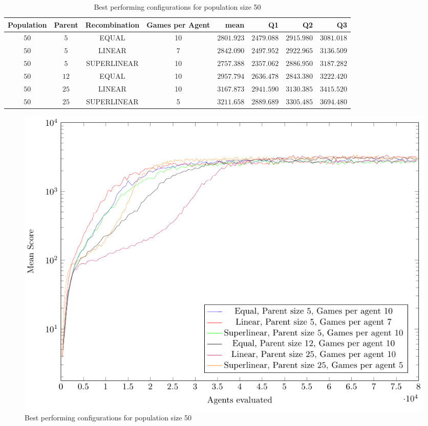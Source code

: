 \begin{table}[H]
\centering
\small
\begin{tabular}{c c c c r r r r}
Population & Parent & Recombination & Games per Agent & mean & Q1 & Q2 & Q3\\
\hline
$50$ & $5$ & EQUAL & 10 & $2801.923$ & $2479.088$ & $2915.980$ & $3081.018$\\
$50$ & $5$ & LINEAR & 7 & $2842.090$ & $2497.952$ & $2922.965$ & $3136.509$\\
$50$ & $5$ & SUPERLINEAR & 10 & $2757.388$ & $2357.062$ & $2886.950$ & $3187.282$\\
$50$ & $12$ & EQUAL & 10 & $2957.794$ & $2636.478$ & $2843.380$ & $3222.420$\\
$50$ & $25$ & LINEAR & 10 & $3167.873$ & $2941.590$ & $3130.385$ & $3415.520$\\
$50$ & $25$ & SUPERLINEAR & 5 & $3211.658$ & $2889.689$ & $3305.485$ & $3694.480$\\
\end{tabular}
\caption{Best performing configurations for population size 50}
\end{table}

\begin{figure}[H]
\centering
\includegraphics[scale=1]{data/cma_population_offspring/bestofeach_population/50x/PlotFile.pdf}
\caption{Best performing configurations for population size 50}
\end{figure}

\clearpage

